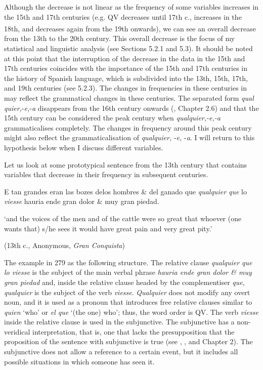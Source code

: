 Although the decrease is not linear as the frequency of some variables increases in the 15th and 17th centuries (e.g. QV decreases until 17th c., increases in the 18th, and decreases again from the 19th\textsuperscript{} onwards), we can see an overall decrease from the 13th to the 20th century. This overall decrease is the focus of my statistical and linguistic analysis (see Sections 5.2.1 and 5.3). It should be noted at this point that the interruption of the decrease in the data in the 15th and 17th centuries coincides with the importance of the 15th and 17th centuries in the history of Spanish language, which is subdivided into the 13th, 15th, 17th, and 19th centuries (see 5.2.3). The changes in frequencies in these centuries in  may reflect the grammatical changes in these centuries. The separated form \textit{qual quier,}\nobreakdash-\textit{e,}\nobreakdash-\textit{a} disappears from the 16th century onwards (\citealt{Pato2012}, Chapter 2.6) and that the 15th century can be considered the peak century when \textit{qualquier,-e,-a} grammaticalises completely. The changes in frequency around this peak century might also reflect the grammaticalisation of \textit{qualquier,} \nobreakdash-\textit{e,} \nobreakdash-\textit{a}. I will return to this hypothesis below when I discuss different variables.

  Let us look at some prototypical sentence from the 13th century that contains variables that decrease in their frequency in subsequent centuries. 

  E tan grandes eran las bozes delos hombres \& del ganado que \textit{qualquier que} lo \textit{viesse} hauria ende gran dolor \& muy gran piedad. 

  ‘and the voices of the men and of the cattle were so great that whoever (one wants that) s/he sees it would have great pain and very great pity.’

  (13th c., Anonymous, \textit{Gran Conquista})

The example in 279 as the following structure. The relative clause \textit{qualquier que} \textit{lo viesse} is the subject of the main verbal phrase \textit{hauria ende gran dolor \& muy gran piedad} and, inside the relative clause headed by the complementiser \textit{que}, \textit{qualquier} is the subject of the verb \textit{viesse}. \textit{Qualquier} does not modify any overt noun, and it is used as a pronoun that introduces free relative clauses similar to \textit{quien} ‘who’ or \textit{el que} ‘(the one) who’; thus, the word order is QV. The verb \textit{viesse} inside the relative clause is used in the subjunctive. The subjunctive has a non-veridical interpretation, that is, one that lacks the presupposition that the proposition of the sentence with subjunctive is true (see \citealt{Quer1998,Quer2000}, \citealt{Becker2014}, and Chapter 2). The subjunctive does not allow a reference to a certain event, but it includes all possible situations in which someone has seen it.

